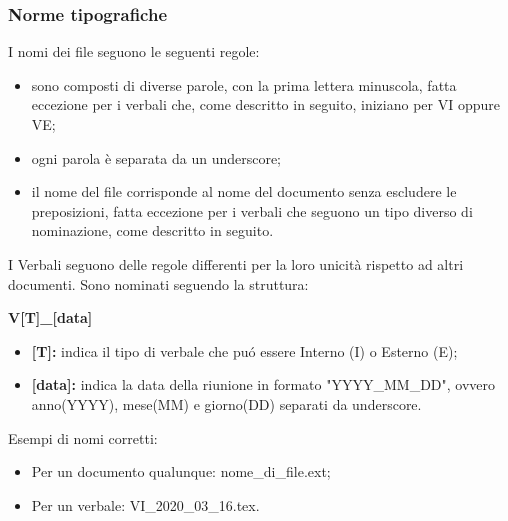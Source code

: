     \subsubsection{Norme tipografiche}
        I nomi dei file seguono le seguenti regole:
        \begin{itemize}
          \item sono composti di diverse parole, con la prima lettera minuscola, fatta eccezione per i verbali che, come descritto in seguito, iniziano per VI oppure VE;
          \item ogni parola è separata da un underscore;
          \item il nome del file corrisponde al nome del documento senza escludere le preposizioni, fatta eccezione per i verbali che seguono un tipo diverso di nominazione, come descritto in seguito.
        \end{itemize}
        I Verbali seguono delle regole differenti per la loro unicità rispetto ad altri documenti. Sono nominati seguendo la struttura:
        \begin{center}
          \textbf{{V[T]\_[data]}}
        \end{center}
        \begin{itemize}
          \item \textbf{[T]:} indica il tipo di verbale che puó essere Interno (I) o Esterno (E);
          \item \textbf{[data]:} indica la data della riunione in formato "YYYY\_MM\_DD", ovvero anno(YYYY), mese(MM) e giorno(DD) separati da underscore.
        \end{itemize}
        Esempi di nomi corretti:
        \begin{itemize}
          \item Per un documento qualunque: nome\_di\_file.ext;
          \item Per un verbale: VI\_2020\_03\_16.tex.
        \end{itemize}

